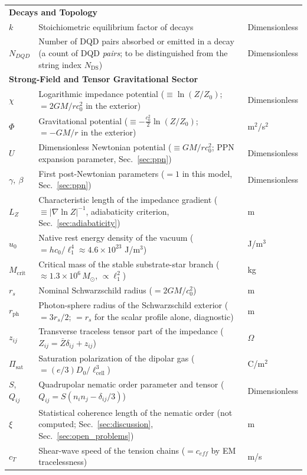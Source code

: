 \documentclass[11pt,a4paper]{article}
\theoremstyle{plain}
\theoremstyle{remark}
\newcommand{\Ncd}{\ensuremath{N_{\mathrm{DS}}}}
\begin{document}
\begin{longtable}{l >{\raggedright\arraybackslash}p{8.8cm} l}
\multicolumn{3}{l}{\textbf{Decays and Topology}} \\
$k$ & Stoichiometric equilibrium factor of decays & Dimensionless \\
$N_{DQD}$ & Number of DQD pairs absorbed or emitted in a decay (a count of DQD \emph{pairs}; to be distinguished from the string index $\Ncd$) & Dimensionless \\
\midrule

\multicolumn{3}{l}{\textbf{Strong-Field and Tensor Gravitational Sector}} \\
$\chi$ & Logarithmic impedance potential ($\equiv \ln(Z/Z_0)$; $= 2GM/rc_0^2$ in the exterior) & Dimensionless \\
$\Phi$ & Gravitational potential ($\equiv -\tfrac{c_0^2}{2}\ln(Z/Z_0)$; $= -GM/r$ in the exterior) & m$^2$/s$^2$ \\
$U$ & Dimensionless Newtonian potential ($\equiv GM/rc_0^2$; PPN expansion parameter, Sec.~\ref{sec:ppn}) & Dimensionless \\
$\gamma,\ \beta$ & First post-Newtonian parameters ($= 1$ in this model, Sec.~\ref{sec:ppn}) & Dimensionless \\
$L_Z$ & Characteristic length of the impedance gradient ($\equiv |\nabla\ln Z|^{-1}$, adiabaticity criterion, Sec.~\ref{sec:adiabaticity}) & m \\
$u_0$ & Native rest energy density of the vacuum ($= hc_0/\ell_1^4 \approx 4.6\times10^{23}$ J/m$^3$) & J/m$^3$ \\
$M_{\text{crit}}$ & Critical mass of the stable substrate-star branch ($\approx 1.3\times10^{6}\,M_\odot$, $\propto \ell_1^2$) & kg \\
$r_s$ & Nominal Schwarzschild radius ($= 2GM/c_0^2$) & m \\
$r_{\text{ph}}$ & Photon-sphere radius of the Schwarzschild exterior ($= 3r_s/2$; $= r_s$ for the scalar profile alone, diagnostic) & m \\
$z_{ij}$ & Transverse traceless tensor part of the impedance ($Z_{ij} = \bar{Z}\delta_{ij} + z_{ij}$) & $\Omega$ \\
$\Pi_{\text{sat}}$ & Saturation polarization of the dipolar gas ($= (e/3)D_0/\ell_{\text{cell}}^3$) & C/m$^2$ \\
$S$, $Q_{ij}$ & Quadrupolar nematic order parameter and tensor ($Q_{ij} = S(n_i n_j - \delta_{ij}/3)$) & Dimensionless \\
$\xi$ & Statistical coherence length of the nematic order (not computed; Sec.~\ref{sec:discussion}, Sec.~\ref{sec:open_problems}) & m \\
$c_T$ & Shear-wave speed of the tension chains ($= c_{eff}$ by EM tracelessness) & m/s \\
\bottomrule
\end{longtable}
\end{document}
